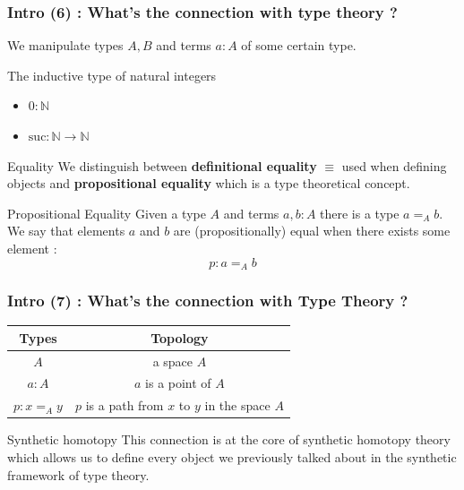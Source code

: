 \documentclass{beamer}
\begin{document}
\begin{frame}
    \frametitle{Intro (6) : What's the connection with type theory ?}
    We manipulate types $A,B$ and terms $a : A$ of some certain type. \\
    \pause
    \begin{exampleblock}{The inductive type of natural integers}
        \begin{itemize}
            \item $0 : \mathbb N$
            \item $\mathrm{suc}: \mathbb N \rightarrow \mathbb N$
        \end{itemize}
    \end{exampleblock}
    \pause
    \begin{block}{Equality}
        We distinguish between \textbf{definitional equality} $\equiv$ used when defining objects and \textbf{propositional equality} which is a type theoretical concept.
    \end{block}
    \pause
    \begin{exampleblock}{Propositional Equality}
        Given a type $A$ and terms $a,b : A$ there is a type $a=_A b$. We say that elements $a$ and $b$ are (propositionally) equal when there exists some element  : $$p : a=_A b$$
    \end{exampleblock}
\end{frame}
\begin{frame}
    \frametitle{Intro (7) : What's the connection with Type Theory ?}
    \begin{center}
        \begin{tabular}{|c|c|}
        \hline Types & Topology  \\
        \hline$A$ & a space $A$   \\
        \hline$a: A$ & $a$ is a point of $A$ \\
        \hline $p : x=_A y$ & $p$ is a path from $x$ to $y$ in the space $A$ \\
        \hline
        \end{tabular}
    \end{center}
    \pause
    \begin{figure}[h]
        \centering
    \end{figure}
    \pause
    \begin{exampleblock}{Synthetic homotopy}
        This connection is at the core of synthetic homotopy theory which allows us to define every object we previously talked about in the synthetic framework of type theory.
    \end{exampleblock}
\end{frame}
\end{document}
